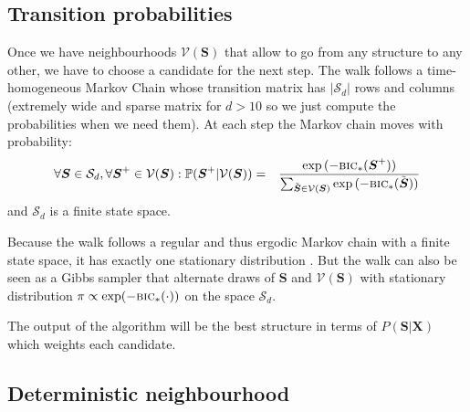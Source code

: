 \documentclass[12pt,a4paper]{report}
\begin{document}
	\subsection{Transition probabilities}
		Once we have neighbourhoods $\mathcal{V}(\boldsymbol{S})$ that allow to go from any structure to any other, we have to choose a candidate for the next step.
The walk follows a time-homogeneous Markov Chain whose transition matrix %
has $|\mathcal{S}_d|$ rows and columns (extremely wide  and sparse matrix for $d>10$ so we just compute the probabilities when we need them).
	At each step the Markov chain moves with probability:
	\begin{eqnarray}
			\forall \boldsymbol{S} \in \mathcal{S}_d, \forall \boldsymbol{S}^+\in \mathcal{V}(\boldsymbol{S}): %
			\mathbb{P}(\boldsymbol{S}^+|\mathcal{V}(\boldsymbol{S}))&=&\frac{\exp{(-\mbox{{\sc bic}}_*(\boldsymbol{S}^+))}}{\sum_{\tilde{\boldsymbol{S}}\in \mathcal{V}(\boldsymbol{S})}\exp{(-\mbox{{\sc bic}}_*(\tilde{\boldsymbol{S}}))}} \label{transitionproba}
	\end{eqnarray}
	and $\mathcal{S}_d$ is a finite state space.%
	 
Because the walk follows a regular and thus ergodic Markov chain with a finite state space, it has exactly one stationary distribution \cite{grinstead1997introduction}. %
%	
%	
%	
But the walk can also be seen as a Gibbs sampler \cite{casella1992explaining} that alternate draws of $\boldsymbol{S}$ and  $\mathcal{V}(\boldsymbol{S})$ with stationary distribution $\pi \propto \operatorname{exp}(-\mbox{{\sc bic}}_*(\cdot))$ on the space $\mathcal{S}_d$.
	
The output of the algorithm will be the best structure in terms of $P(\boldsymbol{S}|\boldsymbol{X})$ which weights each candidate. 
	
		\subsection{Deterministic neighbourhood}
	
\end{document}
